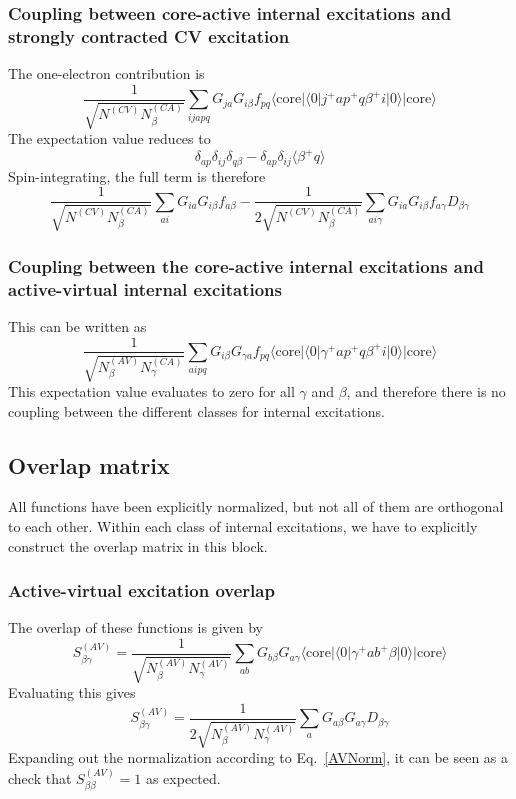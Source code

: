 \documentclass[a4paper,oneside,11pt]{article}
\numberwithin{equation}{section}
\newcommand{\DMETBra}{\langle \mathrm{core}|\langle 0|}
\newcommand{\DMETKet}{|0\rangle| \mathrm{core} \rangle}
\begin{document}
\subsubsection{Coupling between core-active internal excitations and strongly contracted CV excitation}
The one-electron contribution is
\begin{equation}
\frac{1}{\sqrt{N^{(CV)} N^{(CA)}_{\beta}}} \sum_{ijapq} G_{ja} G_{i \beta} f_{pq} \DMETBra j^{+} a p^{+} q \beta^{+} i \DMETKet
\end{equation}
The expectation value reduces to
\begin{equation}
\delta_{ap} \delta_{ij} \delta_{q \beta} - \delta_{ap} \delta_{ij} \langle \beta^{+} q \rangle
\end{equation}
Spin-integrating, the full term is therefore
\begin{equation}
\frac{1}{\sqrt{N^{(CV)} N^{(CA)}_{\beta}}} \sum_{ai} G_{ia} G_{i \beta} f_{a \beta} - \frac{1}{2 \sqrt{N^{(CV)} N^{(CA)}_{\beta}}} \sum_{a i \gamma} G_{ia} G_{i \beta} f_{a \gamma} D_{\beta \gamma}
\end{equation}

\subsubsection{Coupling between the core-active internal excitations and active-virtual internal excitations}
This can be written as
\begin{equation}
\frac{1}{\sqrt{N^{(AV)}_{\beta} N^{(CA)}_{\gamma}}} \sum_{aipq} G_{i \beta} G_{\gamma a} f_{pq} \DMETBra \gamma^{+} a p^{+} q \beta^{+} i \DMETKet
\end{equation}
This expectation value evaluates to zero for all $\gamma$ and $\beta$, and therefore there is no coupling between the different classes for internal excitations.

\subsection{Overlap matrix}

All functions have been explicitly normalized, but not all of them are orthogonal to each other. 
Within each class of internal excitations, we have to explicitly construct the overlap matrix in this block.

\subsubsection{Active-virtual excitation overlap}
The overlap of these functions is given by
\begin{equation}
S^{(AV)}_{\beta \gamma} = \frac{1}{\sqrt{N^{(AV)}_{\beta} N^{(AV)}_{\gamma}}} \sum_{ab} G_{b \beta} G_{a \gamma} \DMETBra \gamma^{+} a b^{+} \beta \DMETKet
\end{equation}
Evaluating this gives
\begin{equation}
S^{(AV)}_{\beta \gamma} = \frac{1}{2 \sqrt{N^{(AV)}_{\beta} N^{(AV)}_{\gamma}}} \sum_{a} G_{a \beta} G_{a \gamma} D_{\beta \gamma}
\end{equation}
Expanding out the normalization according to Eq.~\ref{AVNorm}, it can be seen as a check that $S^{(AV)}_{\beta \beta} = 1$ as expected.
\end{document}
